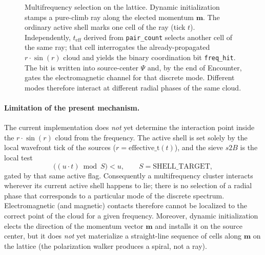\documentclass[a4paper]{article}
\begin{document}
\begin{figure}[htbp]
\caption{Multifrequency selection on the lattice. Dynamic initialization stamps a pure-climb ray along the elected momentum $\boldsymbol{m}$. The ordinary active shell marks one cell of the ray (tick $t$). Independently, $t_{\mathrm{eff}}$ derived from \texttt{pair\_count} selects another cell of the same ray; that cell interrogates the already-propagated $r\cdot\sin(r)$ cloud and yields the binary coordination bit \texttt{freq\_hit}. The bit is written into source-center $\Psi$ and, by the end of Encounter, gates the electromagnetic channel for that discrete mode. Different modes therefore interact at different radial phases of the same cloud.}
\label{fig:multi-frequency}
\end{figure}

\paragraph{Limitation of the present mechanism.}
The current implementation does \emph{not} yet determine the interaction point inside the $r\cdot\sin(r)$ cloud from the frequency. The active shell is set solely by the local wavefront tick of the sources ($r=\mathrm{effective\_t}(t)$), and the sieve $s2B$ is the local test
\[
\bigl((u\cdot t)\bmod S\bigr)<u,\qquad S=\mathrm{SHELL\_TARGET},
\]
gated by that same active flag. Consequently a multifrequency cluster interacts wherever its current active shell happens to lie; there is no selection of a radial phase that corresponds to a particular mode of the discrete spectrum. Electromagnetic (and magnetic) contacts therefore cannot be localized to the correct point of the cloud for a given frequency. Moreover, dynamic initialization elects the direction of the momentum vector $\boldsymbol{m}$ and installs it on the source center, but it does \emph{not} yet materialize a straight-line sequence of cells along $\boldsymbol{m}$ on the lattice (the polarization walker produces a spiral, not a ray).
\end{document}

